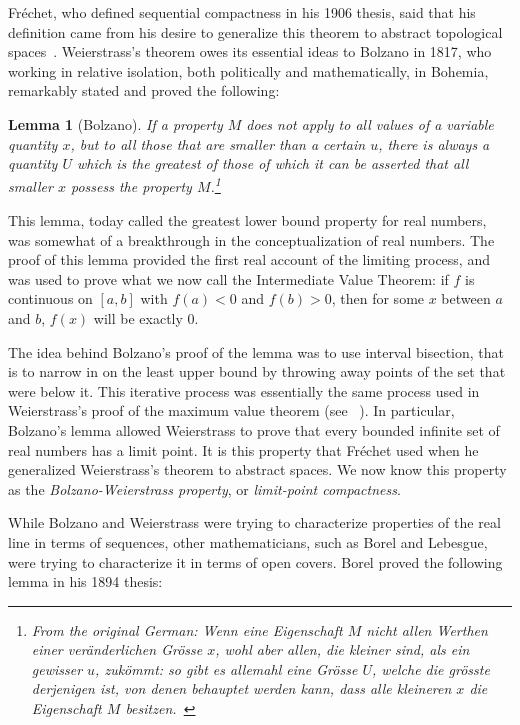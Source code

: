 \documentclass[12pt]{article}
\newtheorem{lem}[thm]{Lemma}
\begin{document}
Fr\'{e}chet, who defined sequential compactness in his 1906 thesis, said that his definition came from his desire to generalize this theorem to abstract topological spaces~\cite[p. 244]{tay1}. Weierstrass's theorem owes its essential ideas to Bolzano in 1817, who working in relative isolation, both politically and mathematically, in Bohemia, remarkably stated and proved the following:  

\begin{lem}[Bolzano]If a property $M$ does not apply to all values of a
 variable quantity $x$, but to all those that are {\em smaller} than a certain $u$, there is
always a quantity $U$ which is the greatest of those of which it can be asserted that
all smaller $x$ possess the property $M$.\footnote{From the original German: Wenn eine Eigenschaft $M$ nicht allen Werthen einer ver\"{a}nderlichen Gr\"{o}sse $x$, wohl aber allen, die kleiner sind, als ein
gewisser $u$, zuk\"{o}mmt: so gibt es allemahl eine Gr\"{o}sse $U$, welche die
gr\"{o}sste derjenigen ist, von denen behauptet werden kann, dass alle
kleineren $x$ die Eigenschaft $M$ besitzen.~\cite[p. 41]{bolz}}
\label{lem:Bolzano}
\end{lem}


This lemma, today called the greatest lower bound property for real numbers, was somewhat of a breakthrough in the conceptualization of real numbers. The proof of this lemma provided the first real account of the limiting process, and was used to prove what we now call the Intermediate Value Theorem: if $f$ is continuous on $[a,b]$ with $f(a)<0$ and $f(b)>0$, then for some $x$ between $a$ and
$b$, $f(x)$ will be exactly $0$.  

The idea behind Bolzano's proof of the lemma was to use interval bisection, that is to narrow in on the least upper bound by throwing away points of the set that were below it. This iterative process was essentially 
the same process used in Weierstrass's proof of the maximum value
theorem (see ~\cite[p.953]{klin}). In particular, Bolzano's lemma allowed Weierstrass
to prove that every bounded infinite set of real numbers has a limit point. It is
this property that Fr\'{e}chet used when he generalized Weierstrass's theorem to
abstract spaces. We now know this property as the {\em Bolzano-Weierstrass property},
or {\em limit-point compactness}.

While Bolzano and Weierstrass were trying to characterize properties of the real line
in terms of sequences, other mathematicians, such as Borel and Lebesgue, were trying to
characterize it in terms of open covers. Borel proved the following lemma in his 1894
thesis:  
\end{document}
